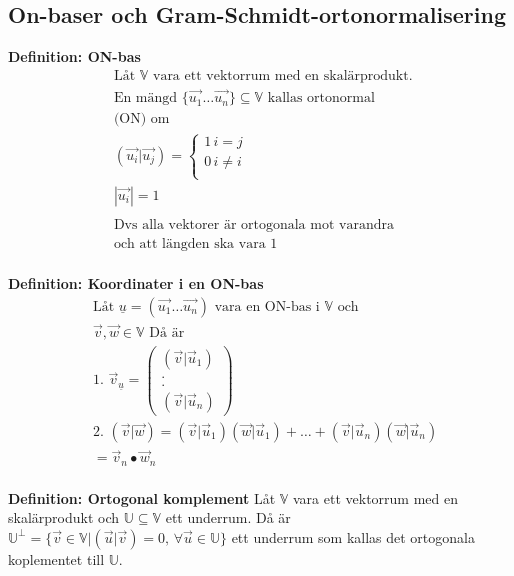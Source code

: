 \begin{multicols}{2}
\section{On-baser och Gram-Schmidt-ortonormalisering}
\textbf{Definition: ON-bas}
\begin{align*}
  &\text{Låt $\mathbb{V}$ vara ett vektorrum med en skalärprodukt. } \\
  &\text{En mängd $\{ \vec{u_1} \ldots \vec{u_n} \} \subseteq \mathbb{V}$ kallas ortonormal} \\
  &\text{(ON) om} \\
  &(\vec{u_i}|\vec{u_j}) = 
  \left\{\begin{array}{rr}
  1 \, i = j \\
  0 \, i \neq i  \\
  \end{array}\right. \\
  &|\vec{u_i}| = 1 \\
  &\\
  &\text{Dvs alla vektorer är ortogonala mot varandra} \\
  &\text{och att längden ska vara $1$} \\
\end{align*}

\textbf{Definition: Koordinater i en ON-bas}
\begin{align*}
  &\text{Låt $\underline{u} = (\vec{u_1} \ldots \vec{u_n})$ vara en ON-bas i $\mathbb{V}$ och } \\
  &\vec{v}, \vec{w} \in\mathbb{V} \text{ Då är} \\
  &\text{1. } \vec{v}_{\underline{u}} =
  \begin{pmatrix} (\vec{v}|\vec{u}_1) \\ . \\ . \\ (\vec{v}|\vec{u}_n) \end{pmatrix} \\
  &\text{2. } (\vec{v}|\vec{w}) =
  (\vec{v}|\vec{u}_1)(\vec{w}|\vec{u}_1)+ \ldots +(\vec{v}|\vec{u}_n)(\vec{w}|\vec{u}_n) \\
  &= \vec{v}_n \bullet \vec{w}_n \\
\end{align*}

\textbf{Definition: Ortogonal komplement}
Låt $\mathbb{V}$ vara ett vektorrum med en skalärprodukt och
$\mathbb{U} \subseteq \mathbb{V}$ ett underrum. Då är
$\mathbb{U}^{\perp} = \{ \vec{v}\in\mathbb{V} | (\vec{u}|\vec{v}) = 0, \, \forall \vec{u} \in \mathbb{U} \}$
ett underrum som kallas det ortogonala koplementet till $\mathbb{U}$.


\end{multicols}
